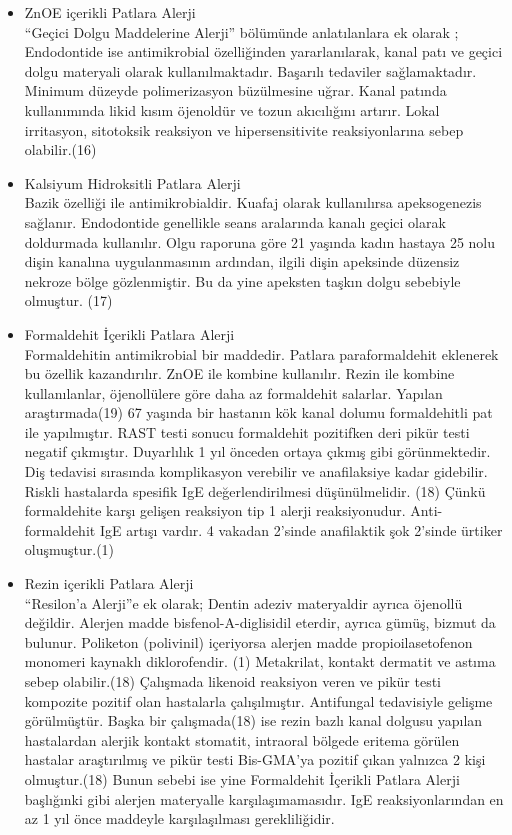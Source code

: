 \begin{itemize}
   \item ZnOE içerikli Patlara Alerji\\
   “Geçici Dolgu Maddelerine Alerji” bölümünde anlatılanlara ek olarak ;
Endodontide ise antimikrobial özelliğinden yararlanılarak, kanal patı ve geçici dolgu materyali olarak kullanılmaktadır.  Başarılı tedaviler sağlamaktadır. Minimum düzeyde polimerizasyon büzülmesine uğrar. Kanal patında kullanımında likid kısım öjenoldür ve tozun akıcılığını artırır. Lokal irritasyon, sitotoksik reaksiyon ve hipersensitivite reaksiyonlarına sebep olabilir.(16)

   \item Kalsiyum Hidroksitli Patlara Alerji\\
   Bazik özelliği ile antimikrobialdir. Kuafaj olarak kullanılırsa  apeksogenezis sağlanır. Endodontide genellikle seans aralarında kanalı geçici olarak doldurmada kullanılır. Olgu raporuna göre 21 yaşında kadın hastaya 25 nolu dişin kanalına uygulanmasının ardından, ilgili dişin apeksinde düzensiz nekroze bölge gözlenmiştir. Bu da yine apeksten taşkın dolgu sebebiyle olmuştur. (17)
   \item Formaldehit İçerikli Patlara Alerji\\
   Formaldehitin  antimikrobial bir maddedir. Patlara paraformaldehit eklenerek bu özellik kazandırılır. ZnOE ile kombine kullanılır.  Rezin ile kombine kullanılanlar, öjenollülere göre daha az formaldehit salarlar. Yapılan araştırmada(19) 67 yaşında bir hastanın kök kanal dolumu formaldehitli pat ile yapılmıştır. RAST testi sonucu formaldehit pozitifken deri pikür testi negatif çıkmıştır. Duyarlılık 1 yıl önceden ortaya çıkmış gibi görünmektedir. Diş tedavisi sırasında komplikasyon verebilir ve anafilaksiye kadar gidebilir. Riskli hastalarda spesifik IgE değerlendirilmesi düşünülmelidir. (18) Çünkü formaldehite karşı gelişen reaksiyon tip 1 alerji reaksiyonudur. Anti-formaldehit IgE artışı vardır. 4 vakadan 2’sinde anafilaktik şok 2’sinde  ürtiker oluşmuştur.(1)
   \item Rezin içerikli Patlara Alerji\\
   “Resilon’a Alerji”e ek olarak;
Dentin adeziv materyaldir ayrıca öjenollü değildir.  Alerjen madde bisfenol-A-diglisidil eterdir, ayrıca gümüş, bizmut da bulunur. Poliketon (polivinil) içeriyorsa alerjen madde propioilasetofenon monomeri kaynaklı diklorofendir. (1) Metakrilat, kontakt dermatit ve astıma sebep olabilir.(18) Çalışmada likenoid reaksiyon veren ve pikür testi kompozite pozitif olan hastalarla çalışılmıştır. Antifungal tedavisiyle gelişme görülmüştür. Başka bir çalışmada(18) ise rezin bazlı kanal dolgusu yapılan hastalardan alerjik kontakt stomatit, intraoral bölgede eritema görülen hastalar araştırılmış ve pikür testi Bis-GMA’ya pozitif çıkan yalnızca 2 kişi olmuştur.(18)  Bunun sebebi ise yine Formaldehit İçerikli Patlara Alerji  başlığınki gibi alerjen materyalle karşılaşımamasıdır. IgE reaksiyonlarından en az 1 yıl önce maddeyle karşılaşılması gerekliliğidir. 


\end{itemize}
